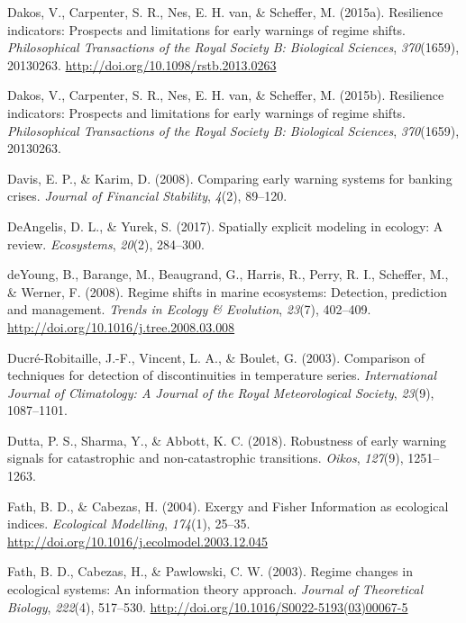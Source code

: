 \documentclass[12pt,twoside,openany]{reedthesis}
\begin{document}
\leavevmode\hypertarget{ref-dakos_resilience_2015}{}%
Dakos, V., Carpenter, S. R., Nes, E. H. van, \& Scheffer, M. (2015a). Resilience indicators: Prospects and limitations for early warnings of regime shifts. \emph{Philosophical Transactions of the Royal Society B: Biological Sciences}, \emph{370}(1659), 20130263. \url{http://doi.org/10.1098/rstb.2013.0263}

\leavevmode\hypertarget{ref-dakos2015resilience}{}%
Dakos, V., Carpenter, S. R., Nes, E. H. van, \& Scheffer, M. (2015b). Resilience indicators: Prospects and limitations for early warnings of regime shifts. \emph{Philosophical Transactions of the Royal Society B: Biological Sciences}, \emph{370}(1659), 20130263.

\leavevmode\hypertarget{ref-davis_comparing_2008}{}%
Davis, E. P., \& Karim, D. (2008). Comparing early warning systems for banking crises. \emph{Journal of Financial Stability}, \emph{4}(2), 89--120.

\leavevmode\hypertarget{ref-deangelis2017spatially}{}%
DeAngelis, D. L., \& Yurek, S. (2017). Spatially explicit modeling in ecology: A review. \emph{Ecosystems}, \emph{20}(2), 284--300.

\leavevmode\hypertarget{ref-deyoung_regime_2008}{}%
deYoung, B., Barange, M., Beaugrand, G., Harris, R., Perry, R. I., Scheffer, M., \& Werner, F. (2008). Regime shifts in marine ecosystems: Detection, prediction and management. \emph{Trends in Ecology \& Evolution}, \emph{23}(7), 402--409. \url{http://doi.org/10.1016/j.tree.2008.03.008}

\leavevmode\hypertarget{ref-ducre2003comparison}{}%
Ducré-Robitaille, J.-F., Vincent, L. A., \& Boulet, G. (2003). Comparison of techniques for detection of discontinuities in temperature series. \emph{International Journal of Climatology: A Journal of the Royal Meteorological Society}, \emph{23}(9), 1087--1101.

\leavevmode\hypertarget{ref-dutta2018robustness}{}%
Dutta, P. S., Sharma, Y., \& Abbott, K. C. (2018). Robustness of early warning signals for catastrophic and non-catastrophic transitions. \emph{Oikos}, \emph{127}(9), 1251--1263.

\leavevmode\hypertarget{ref-fath_exergy_2004}{}%
Fath, B. D., \& Cabezas, H. (2004). Exergy and Fisher Information as ecological indices. \emph{Ecological Modelling}, \emph{174}(1), 25--35. \url{http://doi.org/10.1016/j.ecolmodel.2003.12.045}

\leavevmode\hypertarget{ref-fath_regime_2003}{}%
Fath, B. D., Cabezas, H., \& Pawlowski, C. W. (2003). Regime changes in ecological systems: An information theory approach. \emph{Journal of Theoretical Biology}, \emph{222}(4), 517--530. \url{http://doi.org/10.1016/S0022-5193(03)00067-5}
\end{document}
